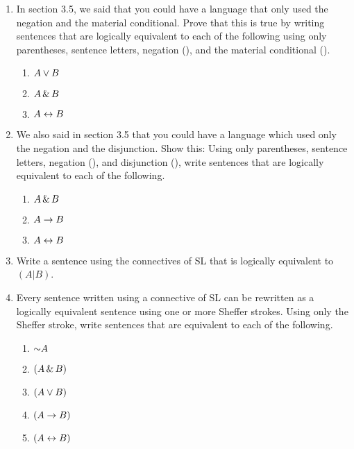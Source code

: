 \noindent\problempart
\begin{enumerate}
\item In section 3.5, we said that you could have a language that only used the negation and the material conditional. Prove that this is true by writing sentences that are logically equivalent to each of the following using only parentheses, sentence letters, negation (\enot), and the material conditional (\eif).
\begin{enumerate}
\item $A\vee B$
\item $A\,\&\, B$
\item $A\leftrightarrow B$
\end{enumerate}

\item We also said in section 3.5 that you could have a language which used only the negation and the disjunction. Show this: Using only parentheses, sentence letters, negation (\enot), and disjunction (\eor), write sentences that are logically equivalent to each of the following.
\begin{enumerate}

\item $A \,\&\, B$
\item $A \rightarrow B$
\item $A \leftrightarrow B$
\end{enumerate}

\item Write a sentence using the connectives of SL that is logically equivalent to $(A|B)$.
\item Every sentence written using a connective of SL can be rewritten as a logically equivalent sentence using one or more Sheffer strokes. Using only the Sheffer stroke, write sentences that are equivalent to each of the following. 
\begin{enumerate}
\item $\mathord{\sim} A$
\item $(A\,\&\, B)$
\item $(A\vee B)$
\item $(A\rightarrow B)$
\item $(A\leftrightarrow B)$
\end{enumerate}
\end{enumerate}



